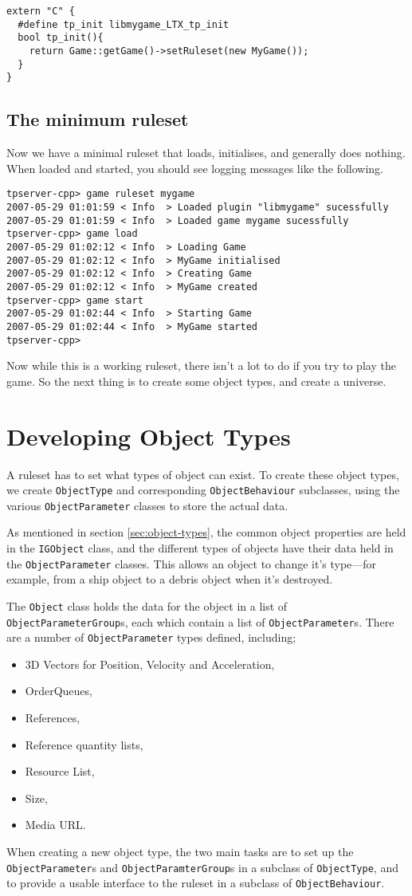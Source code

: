 \documentclass[a4paper,11pt]{report}
\newcommand{\codename}[1]{\texttt{#1}}
\begin{document}
\begin{verbatim}
extern "C" {
  #define tp_init libmygame_LTX_tp_init
  bool tp_init(){
    return Game::getGame()->setRuleset(new MyGame());
  }
}
\end{verbatim}

\section{The minimum ruleset}
Now we have a minimal ruleset that loads, initialises, and generally does nothing. When loaded and started, you should see logging messages like the following.

\begin{verbatim}
tpserver-cpp> game ruleset mygame
2007-05-29 01:01:59 < Info  > Loaded plugin "libmygame" sucessfully
2007-05-29 01:01:59 < Info  > Loaded game mygame sucessfully
tpserver-cpp> game load
2007-05-29 01:02:12 < Info  > Loading Game
2007-05-29 01:02:12 < Info  > MyGame initialised
2007-05-29 01:02:12 < Info  > Creating Game
2007-05-29 01:02:12 < Info  > MyGame created
tpserver-cpp> game start
2007-05-29 01:02:44 < Info  > Starting Game
2007-05-29 01:02:44 < Info  > MyGame started
tpserver-cpp>
\end{verbatim}

Now while this is a working ruleset, there isn't a lot to do if you try to play the game. So the next thing is to create some object types, and create a universe.

\chapter{Developing Object Types}
\label{chap:objectdata-writing}

A ruleset has to set what types of object can exist. To create these object types, we create \codename{ObjectType} and corresponding \codename{ObjectBehaviour} subclasses, using the various \codename{ObjectParameter} classes to store the actual data.

As mentioned in section \ref{sec:object-types}, the common object properties are held in the \codename{IGObject} class, and the different types of objects have their data held in the \codename{ObjectParameter} classes. This allows an object to change it's type---for example, from a ship object to a debris object when it's destroyed.

The \codename{Object} class holds the data for the object in a list of \codename{ObjectParameterGroup}s, each which contain a list of \codename{ObjectParameter}s. There are a number of \codename{ObjectParameter} types defined, including;
\begin{itemize}
\item 3D Vectors for Position, Velocity and Acceleration,
\item OrderQueues,
\item References,
\item Reference quantity lists,
\item Resource List,
\item Size,
\item Media URL.
\end{itemize}

When creating a new object type, the two main tasks are to set up the \codename{ObjectParameter}s and \codename{ObjectParamterGroup}s in a subclass of \codename{ObjectType}, and to provide a usable interface to the ruleset in a subclass of \codename{ObjectBehaviour}.
\end{document}
